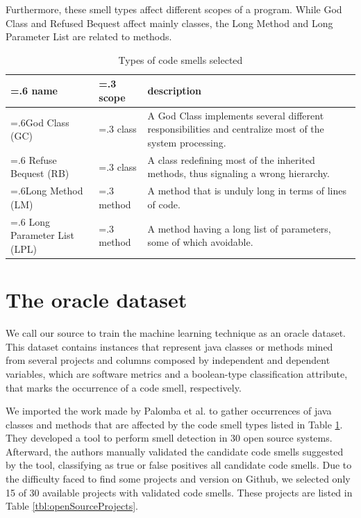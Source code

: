 Furthermore, these smell types affect different scopes of a program. While God Class and Refused Bequest affect mainly classes,
the Long Method and Long Parameter List are related to methods.

\begin{table}[ht]
\centering
\setlength{\extrarowheight}{0pt}
\addtolength{\extrarowheight}{\aboverulesep}
\addtolength{\extrarowheight}{\belowrulesep}
\setlength{\aboverulesep}{0pt}
\setlength{\belowrulesep}{0pt}
\caption{Types of code smells selected \cite{fowler1999refactoring}}
\label{tbl:codeSmellTypes}
\begin{tabularx}{\columnwidth}{>{\hsize=.6\hsize}X>{\hsize=.3\hsize}X>{\hsize=1.1\hsize}X}
\toprule
\rowcolor[rgb]{0.753,0.753,0.753}  \textbf{name}      & \textbf{scope}      & \textbf{description}            \\ 
\toprule
God Class (GC)                                             & class & A God Class implements several different responsibilities and centralize most of the system processing.  \\
\rowcolor[rgb]{0.753,0.753,0.753} Refuse Bequest (RB)      & class & A class redefining most of the inherited methods, thus signaling a wrong hierarchy.                      \\
Long Method (LM)                                       & method & A method that is unduly long in terms of lines of code.                                                  \\
\rowcolor[rgb]{0.753,0.753,0.753} Long Parameter List (LPL)& method & A method having a long list of parameters, some of which avoidable.                                      \\
\bottomrule
\end{tabularx}
\end{table}

\section{The oracle dataset}

We call our source to train the machine learning technique as an oracle dataset. This dataset contains instances that represent java classes or methods mined from several projects and columns composed by independent and dependent variables, which are software metrics and a boolean-type classification attribute, that marks the occurrence of a code smell, respectively. 

We imported the work made by Palomba et al. \cite{palomba2018diffuseness} to gather occurrences of java classes and methods that are affected by the code smell types listed in Table \ref{tbl:codeSmellTypes}. They developed a tool to perform smell detection in 30 open source systems. Afterward, the authors manually validated the candidate code smells suggested by the tool, classifying as true or false positives all candidate code smells. Due to the difficulty faced to find some projects and version on Github, we selected only 15 of 30 available projects with validated code smells. These projects are listed in Table \ref{tbl:openSourceProjects}. 


